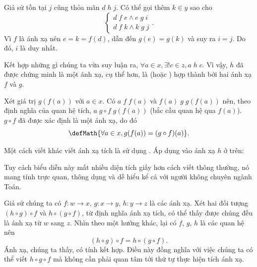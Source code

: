 Giả sử tồn tại $j$ cũng thỏa mãn $d\;h\;j$. Có thể gọi thêm $k \in y$ sao cho
\begin{equation*}
   \begin{cases}
      d\;f\;e \land e\;g\;i \\
      d\;f\;k \land k\;g\;j
   \end{cases}.
\end{equation*}
Vì $f$ là ánh xạ nên $e = k = f(d)$, dẫn đến $g(e) = g(k)$ và suy ra $i = j$. Do đó, $i$ là duy nhất.

Kết hợp những gì chúng ta vừa suy luận ra, $\forall a\in x, \exists ! c \in z, a\;h\;c$. Vì vậy, $h$ đã được chứng minh là một ánh xạ, cụ thể hơn, là  (hoặc ) hợp thành bởi hai ánh xạ $f$ và $g$. 

Xét giá trị $g(f(a))$ với $a \in x$. Có $a\;f\;f(a)$ và $f(a)\;g\;g(f(a))$ nên, theo định nghĩa của quan hệ tích, $a\;g\circ f\;g(f(a))$ (bắc cầu quan hệ qua $f(a)$). $g \circ f$ đã được xác định là một ánh xạ, do đó
\begin{equation*}
   \defMath{\forall a \in x, g(f(a)) = (g \circ f)(a)}.
\end{equation*}

Một cách viết khác viết ánh xạ tích là sử dụng . Áp dụng vào ánh xạ $h$ ở trên:
\begin{center}
\end{center}
Tuy cách biểu diễn này mất nhiều diện tích giấy hơn cách viết thông thường, nó mang tính trực quan, thông dụng và dễ hiểu kể cả với người không chuyên ngành Toán.

Giả sử chúng ta có $f: w \to x$, $g: x \to y$, $h: y \to z$ là các ánh xạ. Xét hai đối tượng $(h \circ g) \circ f$ và $h \circ (g \circ f)$, từ định nghĩa ánh xạ tích, có thể thấy được chúng đều là ánh xạ từ $w$ sang $z$. Nhìn theo một hướng khác, lại có $f$, $g$, $h$ là các quan hệ nên 
\begin{equation*}
   (h \circ g) \circ f = h \circ (g \circ f).
\end{equation*}
Ánh xạ, chúng ta thấy, có tính kết hợp. Điều này đồng nghĩa với việc chúng ta có thể viết $h \circ g \circ f$ mà không cần phải quan tâm tới thứ tự thực hiện tích ánh xạ.

